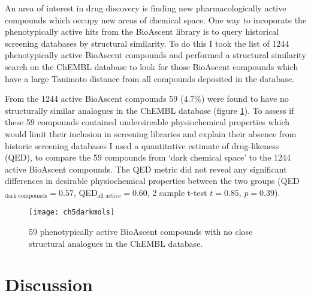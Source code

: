 \documentclass[a4paper,11pt,twoside,openright]{scrbook}
\begin{document}
An area of interest in drug discovery is finding new pharmacologically active compounds which occupy new areas of chemical space. \cite{Wassermann2015}
One way to incoporate the phenotypically active hits from the BioAscent library is to query historical screening databases by structural similarity.
To do this I took the list of 1244 phenotypically active BioAscent compounds and performed a structural similarity search on the ChEMBL database to look for those BioAscent compounds which have a large Tanimoto distance from all compounds deposited in the database.

From the 1244 active BioAscent compounds 59 (4.7\%) were found to have no structurally similar analogues in the ChEMBL database (figure \ref{figure:dark_mols}).
To assess if these 59 compounds contained undersireable physiochemical properties which would limit their inclusion in screening libraries and explain their absence from historic screening databases I used a quantitative estimate of drug-likeness (QED), \cite{Bickerton2012} to compare the 59 compounds from `dark chemical space' to the 1244 active BioAscent compounds.
The QED metric did not reveal any significant differences in desirable physiochemical properties between the two groups (QED$_{\text{dark compounds}} = 0.57$,  QED$_{\text{all active}} = 0.60$, 2 sample t-test $t=0.85$, $p=0.39$).


\begin{figure}
    \captionsetup{width=1.0\textwidth}
    \caption[BioAscent hits from dark chemical space]{
59 phenotypically active BioAscent compounds with no close structural analogues in the ChEMBL database.
}
    \texttt{[image: ch5darkmols]}
    \label{figure:dark_mols}
\end{figure}



















\section{Discussion}
\end{document}
